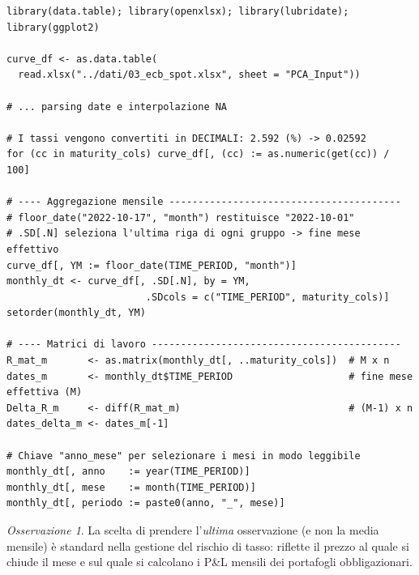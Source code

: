\documentclass[11pt,a4paper]{article}
\theoremstyle{plain}
\theoremstyle{definition}
\theoremstyle{remark}
\newtheorem*{osservazione}{Osservazione}
\begin{document}
\begin{codebox}
\begin{Verbatim}[fontsize=\small]
library(data.table); library(openxlsx); library(lubridate); library(ggplot2)

curve_df <- as.data.table(
  read.xlsx("../dati/03_ecb_spot.xlsx", sheet = "PCA_Input"))

# ... parsing date e interpolazione NA

# I tassi vengono convertiti in DECIMALI: 2.592 (%) -> 0.02592
for (cc in maturity_cols) curve_df[, (cc) := as.numeric(get(cc)) / 100]

# ---- Aggregazione mensile ----------------------------------------
# floor_date("2022-10-17", "month") restituisce "2022-10-01"
# .SD[.N] seleziona l'ultima riga di ogni gruppo -> fine mese effettivo
curve_df[, YM := floor_date(TIME_PERIOD, "month")]
monthly_dt <- curve_df[, .SD[.N], by = YM,
                        .SDcols = c("TIME_PERIOD", maturity_cols)]
setorder(monthly_dt, YM)

# ---- Matrici di lavoro -------------------------------------------
R_mat_m       <- as.matrix(monthly_dt[, ..maturity_cols])  # M x n
dates_m       <- monthly_dt$TIME_PERIOD                    # fine mese effettiva (M)
Delta_R_m     <- diff(R_mat_m)                             # (M-1) x n
dates_delta_m <- dates_m[-1]

# Chiave "anno_mese" per selezionare i mesi in modo leggibile
monthly_dt[, anno    := year(TIME_PERIOD)]
monthly_dt[, mese    := month(TIME_PERIOD)]
monthly_dt[, periodo := paste0(anno, "_", mese)]
\end{Verbatim}
\end{codebox}

\begin{osservazione}
La scelta di prendere l'\emph{ultima} osservazione (e non la media mensile) è
standard nella gestione del rischio di tasso: riflette il prezzo al quale si
chiude il mese e sul quale si calcolano i P\&L mensili dei portafogli obbligazionari.
\end{osservazione}

%
\end{document}
